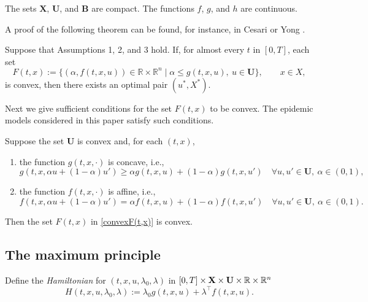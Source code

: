 \begin{assumption}\rm The sets $\mathbf{X}$,  $\mathbf{U}$, and $\mathbf{B}$ are compact. The functions $f$, $g$, and $h$ are continuous.
\end{assumption}
A proof of the following theorem can be found, for instance, in Cesari \cite[Sect. 9.3.]{Cesari83} or Yong \cite[Theorem 2.2.1]{Yong2015}. 
\begin{theorem}[Filippov] Suppose that Assumptions 1, 2, and 3 hold. If, for almost every $t$ in $[0,T]$, each set
        \begin{equation}\label{convexF(t,x)}
F(t,x):= \{ (\alpha, f(t,x,u))\in \mathbb{R}\times \mathbb{R}^n\mid  
    \alpha \leq g(t,x,u), \  u\in \mathbf{U}\},\qquad x\in X,
        \end{equation}
is convex, then there exists an optimal pair $(u^\ast,X^\ast)$.
\end{theorem} 
Next we give sufficient conditions for the set $F(t,x)$ to be convex. The epidemic models considered in this paper satisfy such conditions.

\begin{remark}\rm Suppose the set $\mathbf{U}$ is convex and, for each $(t,x)$, 
\begin{enumerate}[\rm (a)]
    \item the function $g(t,x,\cdot)$ is concave, i.e.,
        \[ g(t,x,\alpha u+(1-\alpha)u') \geq \alpha g(t,x,u) +(1-\alpha) g(t,x,u') \quad \forall u,u'\in\mathbf{U},\  \alpha\in (0,1), \]
       
    \item the function $f(t,x,\cdot)$ is affine, i.e., 
      \[ f(t,x,\alpha u+(1-\alpha)u') = \alpha f(t,x,u) +(1-\alpha) f(t,x,u') \quad \forall  u,u'\in\mathbf{U},\   \alpha\in (0,1). \]
\end{enumerate} 
Then the set $F(t,x)$ in \eqref{convexF(t,x)} is convex.
\end{remark}








\subsection{The maximum principle}


Define the {\it Hamiltonian} for $(t,x,u,\lambda_0,\lambda)$ in $[0,T]\times \mathbf{X}\times \mathbf{U}\times\mathbb{R}\times\mathbb{R}^n$
    \[H(t,x,u,\lambda_0,\lambda):= \lambda_0g(t,x,u) + \lambda^\top f(t,x,u).  \]  
    

